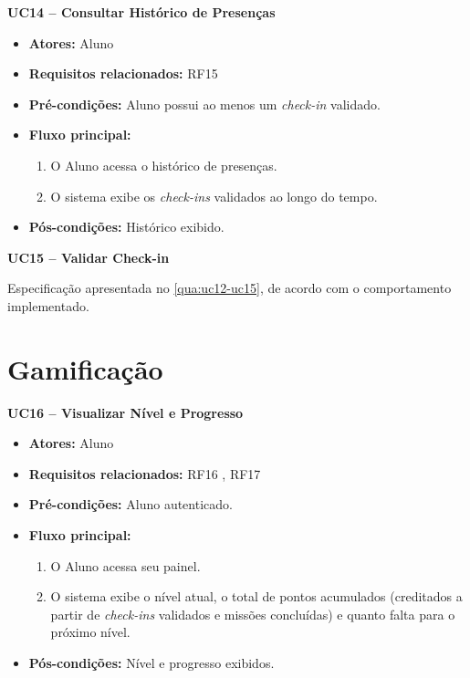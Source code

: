 \noindent\textbf{UC14 -- Consultar Histórico de Presenças}
\begin{itemize}[leftmargin=*, itemsep=0pt, topsep=2pt]
  \item \textbf{Atores:} Aluno
  \item \textbf{Requisitos relacionados:} RF15
  \item \textbf{Pré-condições:} Aluno possui ao menos um \textit{check-in} validado.
  \item \textbf{Fluxo principal:}
  \begin{enumerate}[label=\arabic*., itemsep=0pt, topsep=0pt]
    \item O Aluno acessa o histórico de presenças.
    \item O sistema exibe os \textit{check-ins} validados ao longo do tempo.
  \end{enumerate}
  \item \textbf{Pós-condições:} Histórico exibido.
\end{itemize}
\medskip

\noindent\textbf{UC15 -- Validar Check-in}
\par\noindent Especificação apresentada no \autoref{qua:uc12-uc15}, de acordo com o comportamento implementado.

\medskip

\section*{Gamificação}

\noindent\textbf{UC16 -- Visualizar Nível e Progresso}
\begin{itemize}[leftmargin=*, itemsep=0pt, topsep=2pt]
  \item \textbf{Atores:} Aluno
  \item \textbf{Requisitos relacionados:} RF16 , RF17
  \item \textbf{Pré-condições:} Aluno autenticado.
  \item \textbf{Fluxo principal:}
  \begin{enumerate}[label=\arabic*., itemsep=0pt, topsep=0pt]
    \item O Aluno acessa seu painel.
    \item O sistema exibe o nível atual, o total de pontos acumulados (creditados a partir de \textit{check-ins} validados e missões concluídas) e quanto falta para o próximo nível.
  \end{enumerate}
  \item \textbf{Pós-condições:} Nível e progresso exibidos.
\end{itemize}
\medskip

